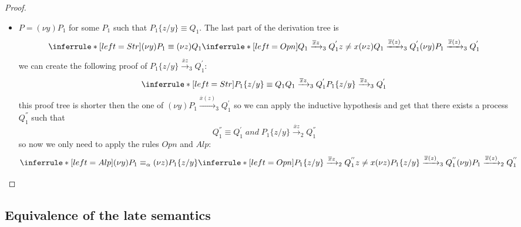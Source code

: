 \begin{theorem}
\begin{proof}
\begin{description}
\begin{description}
\begin{itemize}
\begin{description}
\begin{itemize}
\[{			    \\
			      z\neq x
			  }{
			    (\nu z)P_{1}\xrightarrow{\overline{x}z}_{2}Q_{1}^{''}
			  }
			\]
		      \item
			$P=(\nu y) P_{1}$ for some $P_{1}$ such that $P_{1}\{z/y\}\equiv Q_{1}$. The last part of the derivation tree is 
			\[
			  \inferrule* [left=Str]{
			      (\nu y) P_{1}\equiv (\nu z) Q_{1}
			    \\
			      \inferrule* [left=Opn]{
				  Q_{1} \xrightarrow{\overline{x}z}_{3} Q_{1}^{'}
				\\
				  z\neq x
			      }{
				(\nu z) Q_{1} \xrightarrow{\overline{x}(z)}_{3} Q_{1}^{'}
			      }
			  }{
			    (\nu y) P_{1} \xrightarrow{\overline{x}(z)}_{3} Q_{1}^{'}
			  }
			\]
			we can create the following proof of $P_{1}\{z/y\} \xrightarrow{\overline{x}z}_{3} Q_{1}^{'}$:
			\[
			  \inferrule* [left=Str]{
			      P_{1}\{z/y\}\equiv Q_{1}
			    \\
			      Q_{1} 
				\xrightarrow{\overline{x}z}_{3} 
				  Q_{1}^{'}
			  }{
			    P_{1}\{z/y\} 
			      \xrightarrow{\overline{x}z}_{3} 
				Q_{1}^{'}
			  }
			\]
			this proof tree is shorter then the one of $(\nu y) P_{1} \xrightarrow{\overline{x}(z)}_{3} Q_{1}^{'}$ so we can apply the inductive hypothesis and get that there exists a process $Q_{1}^{''}$ such that
			\[
			  Q_{1}^{''}\equiv Q_{1}^{'}\; and\;
			    P_{1}\{z/y\} 
			      \xrightarrow{\overline{x}z}_{2} 
				Q_{1}^{''} 
			\]
			so now we only need to apply the rules $Opn$ and $Alp$:
			\[
			  \inferrule* [left=Alp]{
			      (\nu y) P_{1}\equiv_{\alpha} (\nu z) P_{1}\{z/y\}
			    \\
			      \inferrule* [left=Opn]{
				  P_{1}\{z/y\} \xrightarrow{\overline{x}z}_{2} Q_{1}^{''}
				\\
				  z\neq x
			      }{
				(\nu z) P_{1}\{z/y\} \xrightarrow{\overline{x}(z)}_{3} Q_{1}^{''}
			      }
			  }{
			    (\nu y) P_{1} \xrightarrow{\overline{x}(z)}_{2} Q_{1}^{''}
			  }
			\]
		  \end{itemize}
		\end{description}
	    \end{itemize}	    
	\end{description}
    \end{description}
  \end{proof}
\end{theorem}



\subsection{Equivalence of the late semantics}


